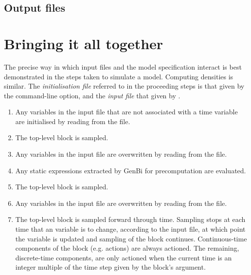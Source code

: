 \subsection{Output files}

\section{Bringing it all together\label{Bringing_it_all_together}}

The precise way in which input files and the model specification interact is
best demonstrated in the steps taken to simulate a model. Computing densities
is similar. The \emph{initialisation file} referred to in the proceeding steps
is that given by the  command-line option, and the
\emph{input file} that given by .
\begin{enumerate}
\item Any  variables in the input file that are not associated with
  a time variable are initialised by reading from the file.
\item The  top-level block is sampled.
\item Any  variables in the input file are overwritten by reading
  from the file.
\item Any static expressions extracted by GenBi for precomputation are
  evaluated.
\item The  top-level block is sampled.
\item Any  variables in the input file are overwritten by reading
  from the file.
\item The  top-level block is sampled forward through
  time. Sampling stops at each time that an  variable is to
  change, according to the input file, at which point the 
  variable is updated and sampling of the  block
  continues. Continuous-time components of the
   block (e.g.  actions) are always
  actioned. The remaining, discrete-time components, are
  only actioned when the current time is an integer multiple of the time step
  given by the  block's  argument.
\end{enumerate}

